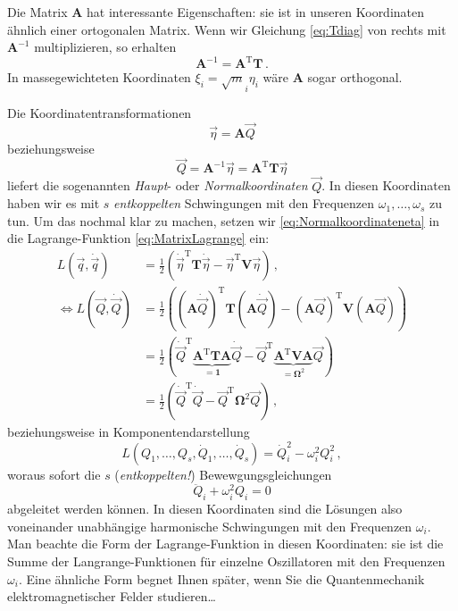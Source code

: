 \documentclass[paper=a4, fontsize=11.0pt, abstractoff, DIV12]{scrartcl}
\begin{document}
Die Matrix $\mathbf{A}$ hat interessante Eigenschaften: sie ist in unseren
Koordinaten ähnlich einer ortogonalen Matrix. Wenn wir Gleichung
\eqref{eq:Tdiag} von rechts mit $\mathbf{A}^{-1}$ multiplizieren, so erhalten
\begin{equation}
\mathbf{A}^{-1} = \mathbf{A}^\mathrm{T}\mathbf{T}\,.
\label{eq:Ainverse}
\end{equation}
In massegewichteten Koordinaten $\xi_i = \sqrt{m}_i \eta_i$ wäre $\mathbf{A}$
sogar orthogonal.

Die Koordinatentransformationen
\begin{equation}
\vec \eta = \mathbf{A}\vec{Q}
\label{eq:Normalkoordinateneta}
\end{equation}
beziehungsweise
\begin{equation}
\vec Q = \mathbf{A}^{-1}\vec \eta = \mathbf{A}^{\mathrm{T}}\mathbf{T}\vec \eta
\label{eq:Normalkoordinaten}
\end{equation}
liefert die sogenannten \emph{Haupt}- oder \emph{Normalkoordinaten} $\vec{Q}$.
In diesen Koordinaten haben wir es mit $s$ \emph{entkoppelten}
Schwingungen mit den Frequenzen $\omega_1, \dots, \omega_s$ zu tun. Um das
nochmal klar zu machen, setzen wir \eqref{eq:Normalkoordinateneta} in die
Lagrange-Funktion \eqref{eq:MatrixLagrange} ein:
\begin{align}
L(\vec q, \dot{\vec q}) &= \frac{1}{2}\left(\dot{\vec{\eta}}^\mathrm{T}\mathbf{T}\dot{\vec{\eta}} - \vec{\eta}^\mathrm{T}\mathbf{V}\vec{\eta}\right)\,,\nonumber\\
\Leftrightarrow L(\vec Q, \dot{\vec Q}) &= \frac{1}{2}\left( (\mathbf{A}\dot{\vec Q})^\mathrm{T}\mathbf{T}(\mathbf{A}\dot{\vec Q}) - (\mathbf{A}{\vec Q})^\mathrm{T}\mathbf{V}(\mathbf{A}{\vec Q}) \right) \nonumber\\
&= \frac{1}{2}\left(\dot{\vec{Q}}^\mathrm{T}\underbrace{\mathbf{A}^\mathrm{T}\mathbf{T}\mathbf{A}}_{=\mathbf{1}}\dot{\vec{Q}} - \vec{Q}^\mathrm{T}\underbrace{\mathbf{A}^\mathrm{T}\mathbf{V}\mathbf{A}}_{=\mathbf{\Omega}^2}\vec{Q}\right)\nonumber\\
&= \frac{1}{2}\left(\dot{\vec{Q}}^\mathrm{T}\dot{\vec Q} - {\vec{Q}}^\mathrm{T}\mathbf{\Omega}^2{\vec Q}\right)\,,
\end{align}
beziehungsweise in Komponentendarstellung
\begin{equation}
L(Q_1,\dots,Q_s, \dot{Q}_1,\dots,\dot{Q}_s) = \dot{Q}_i^2 - \omega_i^2 Q_i^2\, ,
\end{equation}
woraus sofort die $s$ (\emph{entkoppelten!}) Bewewgungsgleichungen
\begin{equation}
\ddot{Q}_i + \omega_i^2 Q_i = 0
\end{equation}
abgeleitet werden können. In diesen Koordinaten sind die Lösungen also
voneinander unabhängige harmonische Schwingungen mit den Frequenzen
$\omega_i$. Man beachte die Form der Lagrange-Funktion in diesen Koordinaten:
sie ist die Summe der Langrange-Funktionen für einzelne Oszillatoren mit
den Frequenzen $\omega_i$. Eine ähnliche Form begnet Ihnen später, wenn Sie die
Quantenmechanik elektromagnetischer Felder studieren\dots
\end{document}
